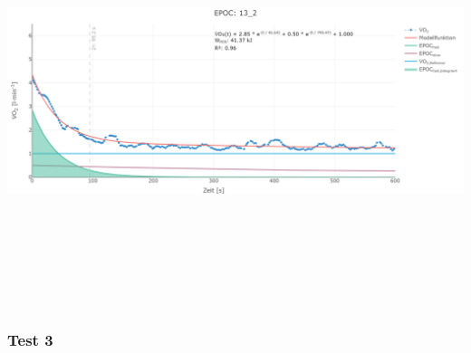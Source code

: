 \documentclass[
  letterpaper,
  DIV=11]{scrartcl}
\begin{document}
\includegraphics[width=11.45833in,height=4.6875in]{images/13_2.png}

\subsubsection{Test 3}
\end{document}
